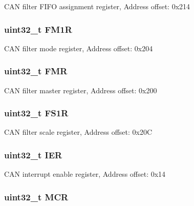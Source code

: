 C\-A\-N filter F\-I\-F\-O assignment register, Address offset\-: 0x214 \hypertarget{struct_c_a_n___type_def_aaa6f4cf1f16aaa6d17ec6c410db76acf}{
\subsubsection[{F\-M1\-R}]{ uint32\-\_\-t F\-M1\-R}}\label{struct_c_a_n___type_def_aaa6f4cf1f16aaa6d17ec6c410db76acf}
C\-A\-N filter mode register, Address offset\-: 0x204 \hypertarget{struct_c_a_n___type_def_a1cb734df34f6520a7204c4c70634ebba}{
\subsubsection[{F\-M\-R}]{ uint32\-\_\-t F\-M\-R}}\label{struct_c_a_n___type_def_a1cb734df34f6520a7204c4c70634ebba}
C\-A\-N filter master register, Address offset\-: 0x200 \hypertarget{struct_c_a_n___type_def_aae0256ae42106ee7f87fc7e5bdb779d4}{
\subsubsection[{F\-S1\-R}]{ uint32\-\_\-t F\-S1\-R}}\label{struct_c_a_n___type_def_aae0256ae42106ee7f87fc7e5bdb779d4}
C\-A\-N filter scale register, Address offset\-: 0x20\-C \hypertarget{struct_c_a_n___type_def_a6566f8cfbd1d8aa7e8db046aa35e77db}{
\subsubsection[{I\-E\-R}]{ uint32\-\_\-t I\-E\-R}}\label{struct_c_a_n___type_def_a6566f8cfbd1d8aa7e8db046aa35e77db}
C\-A\-N interrupt enable register, Address offset\-: 0x14 \hypertarget{struct_c_a_n___type_def_a27af4e9f888f0b7b1e8da7e002d98798}{
\subsubsection[{M\-C\-R}]{ uint32\-\_\-t M\-C\-R}}\label{struct_c_a_n___type_def_a27af4e9f888f0b7b1e8da7e002d98798}
